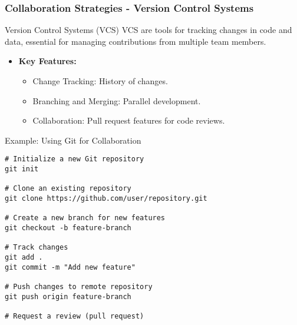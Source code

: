 \documentclass[aspectratio=169]{beamer}
\begin{document}
\begin{frame}[fragile]
    \frametitle{Collaboration Strategies - Version Control Systems}
    \begin{block}{Version Control Systems (VCS)}
        VCS are tools for tracking changes in code and data, essential for managing contributions from multiple team members.
    \end{block}
    \begin{itemize}
        \item \textbf{Key Features:}
            \begin{itemize}
                \item Change Tracking: History of changes.
                \item Branching and Merging: Parallel development.
                \item Collaboration: Pull request features for code reviews.
            \end{itemize}
    \end{itemize}
    \begin{block}{Example: Using Git for Collaboration}
        \begin{lstlisting}
# Initialize a new Git repository
git init

# Clone an existing repository
git clone https://github.com/user/repository.git

# Create a new branch for new features
git checkout -b feature-branch

# Track changes
git add .
git commit -m "Add new feature"

# Push changes to remote repository
git push origin feature-branch

# Request a review (pull request)
        \end{lstlisting}
    \end{block}
\end{frame}
\end{document}
